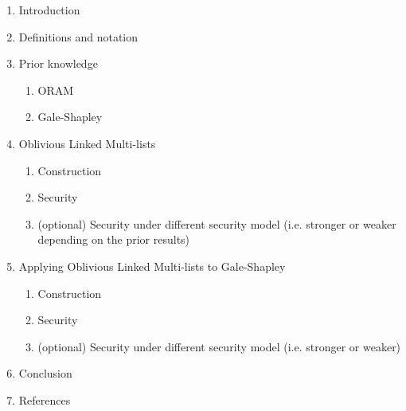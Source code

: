 \begin{enumerate}
  \item Introduction
  \item Definitions and notation
  \item Prior knowledge
  \begin{enumerate}
    \item ORAM
    \item Gale-Shapley
  \end{enumerate}
  \item Oblivious Linked Multi-lists
  \begin{enumerate}
    \item Construction
    \item Security
    \item \color{gray}(optional) Security under different security model (i.e. stronger or weaker depending on the prior results)
  \end{enumerate}
  \item Applying Oblivious Linked Multi-lists to Gale-Shapley
  \begin{enumerate}
    \item Construction
    \item Security
    \item \color{gray}(optional) Security under different security model (i.e. stronger or weaker)
  \end{enumerate}
  \item Conclusion
  \item References
\end{enumerate}